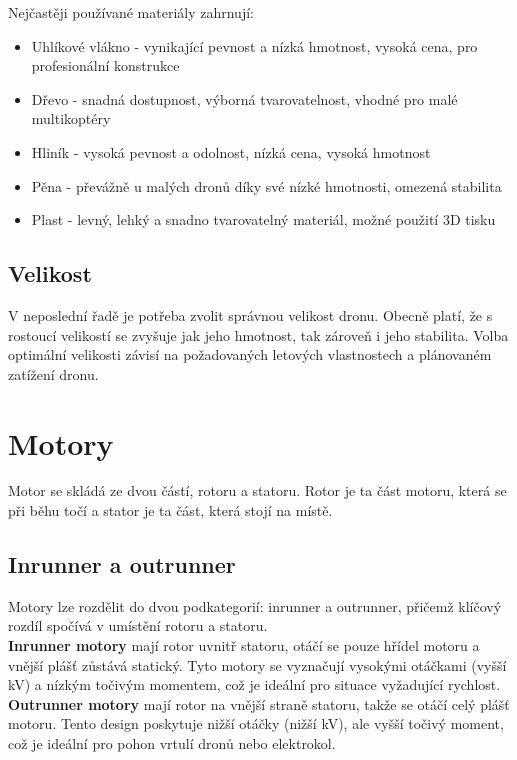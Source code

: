 \documentclass[12pt]{report}
\begin{document}
Nejčastěji používané materiály zahrnují:
\begin{itemize}
	\item Uhlíkové vlákno - vynikající pevnost a nízká hmotnost, vysoká cena, pro profesionální konstrukce
	\item Dřevo - snadná dostupnost, výborná tvarovatelnost, vhodné pro malé multikoptéry
	\item Hliník - vysoká pevnost a odolnost, nízká cena, vysoká hmotnost
	\item Pěna - převážně u malých dronů díky své nízké hmotnosti, omezená stabilita
	\item Plast - levný, lehký a snadno tvarovatelný materiál, možné použití 3D tisku
\end{itemize}

\subsection{Velikost}
V neposlední řadě je potřeba zvolit správnou velikost dronu. Obecně platí, že s rostoucí velikostí se zvyšuje jak jeho hmotnost, tak zároveň i jeho stabilita. Volba optimální velikosti závisí na požadovaných letových vlastnostech a plánovaném zatížení dronu. \cite{mainbook} \cite{dojo} \cite{ultimateguide}

\section{Motory}
Motor se skládá ze dvou částí, rotoru a statoru. Rotor je ta část motoru, která se při běhu točí a stator je ta část, která stojí na místě.

\subsection{Inrunner a outrunner}
Motory lze rozdělit do dvou podkategorií: inrunner a outrunner, přičemž klíčový rozdíl spočívá v umístění rotoru a statoru.\\
\textbf{Inrunner motory} mají rotor uvnitř statoru, otáčí se pouze hřídel motoru a vnější plášť zůstává statický. Tyto motory se vyznačují vysokými otáčkami (vyšší kV) a nízkým točivým momentem, což je ideální pro situace vyžadující rychlost.\\
\textbf{Outrunner motory} mají rotor na vnější straně statoru, takže se otáčí celý plášť motoru. Tento design poskytuje nižší otáčky (nižší kV), ale vyšší točivý moment, což je ideální pro pohon vrtulí dronů nebo elektrokol. 
\end{document}
